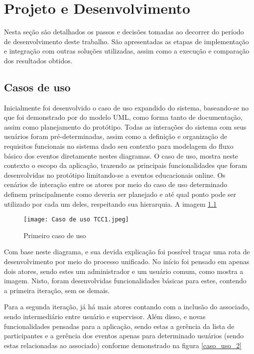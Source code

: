 \chapter{Projeto e Desenvolvimento}\label{chp:LABEL_CHP_4}
Nesta seção são detalhados os passos e decisões tomadas ao decorrer do período de desenvolvimento deste trabalho. São apresentadas as etapas de implementação e integração com outras soluções utilizadas, assim como a execução e comparação dos resultados obtidos.

\section{Casos de uso}
Inicialmente foi desenvolvido o caso de uso expandido do sistema, baseando-se no que foi demonstrado por  do modelo UML, como forma tanto de documentação, assim como planejamento do protótipo. Todas as interações do sistema com seus usuários foram pré-determinadas, assim como a definição e organização de requisitos funcionais no sistema dado seu contexto para modelagem do fluxo básico dos eventos diretamente nestes diagramas. O caso de uso, mostra neste contexto o escopo da aplicação, trazendo as principais funcionalidades que foram desenvolvidas no protótipo limitando-se a eventos educacionais online. Os cenários de interação entre os atores por meio do caso de uso determinado definem principalmente como deveria ser planejado e até qual ponto pode ser utilizado por cada um deles, respeitando sua hierarquia. A imagem \ref{caso_uso_1}

\begin{figure}[H]
    \caption{\label{caso_uso_1}Primeiro caso de uso}
    \vspace{5pt}
    \centering
    \texttt{[image: Caso de uso TCC1.jpeg]}
    \vspace{5pt}
\end{figure}


Com base neste diagrama, e sua devida explicação foi possível traçar uma rota de desenvolvimento por meio do processo unificado. No início foi pensado em apenas dois atores, sendo estes um administrador e um usuário comum, como mostra a imagem. Nisto, foram desenvolvidas funcionalidades básicas para estes, contendo a primeira iteração, sem os demais. 

Para a segunda iteração, já há mais atores contando com a inclusão do associado, sendo intermediário entre usuário e supervisor. Além disso, e novas funcionalidades pensadas para a aplicação, sendo estas a gerência da lista de participantes e a gerência dos eventos apenas para determinado usuários (sendo estas relacionadas ao associado) conforme demonstrado na figura \ref{caso_uso_2}

